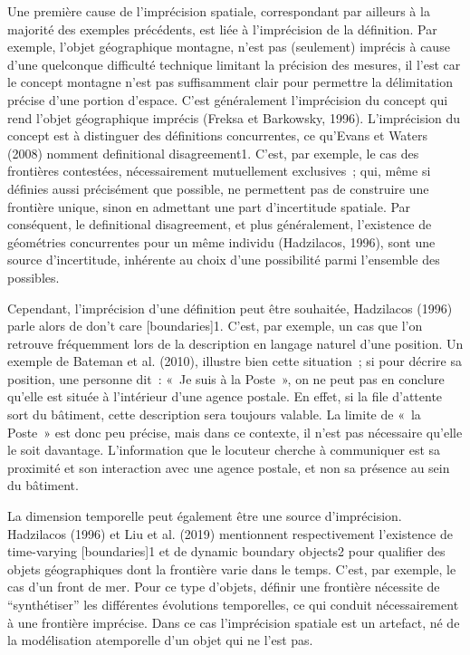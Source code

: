 Une première cause de l’imprécision spatiale, correspondant par
ailleurs à la majorité des exemples précédents, est liée à
l’imprécision de la définition. Par exemple, l’objet géographique
montagne, n’est pas (seulement) imprécis à cause d’une quelconque
difficulté technique limitant la précision des mesures, il l’est car
le concept montagne n’est pas suffisamment clair pour permettre la
délimitation précise d’une portion d’espace. C’est généralement
l’imprécision du concept qui rend l’objet géographique imprécis
(Freksa et Barkowsky, 1996). L’imprécision du concept est à distinguer
des définitions concurrentes, ce qu’Evans et Waters (2008) nomment
definitional disagreement1. C’est, par exemple, le cas des frontières
contestées, nécessairement mutuellement exclusives ; qui, même si
définies aussi précisément que possible, ne permettent pas de
construire une frontière unique, sinon en admettant une part
d’incertitude spatiale. Par conséquent, le definitional disagreement,
et plus généralement, l’existence de géométries concurrentes pour un
même individu (Hadzilacos, 1996), sont une source d’incertitude,
inhérente au choix d’une possibilité parmi l’ensemble des possibles.

Cependant, l’imprécision d’une définition peut être souhaitée,
Hadzilacos (1996) parle alors de don't care [boundaries]1. C’est, par
exemple, un cas que l’on retrouve fréquemment lors de la description
en langage naturel d’une position. Un exemple de Bateman et
al. (2010), illustre bien cette situation ; si pour décrire sa
position, une personne dit : « Je suis à la Poste », on ne peut pas en
conclure qu’elle est située à l’intérieur d’une agence postale. En
effet, si la file d’attente sort du bâtiment, cette description sera
toujours valable. La limite de « la Poste » est donc peu précise, mais
dans ce contexte, il n’est pas nécessaire qu’elle le soit
davantage. L’information que le locuteur cherche à communiquer est sa
proximité et son interaction avec une agence postale, et non sa
présence au sein du bâtiment.

La dimension temporelle peut également être une source
d’imprécision. Hadzilacos (1996) et Liu et al. (2019) mentionnent
respectivement l’existence de time-varying [boundaries]1 et de dynamic
boundary objects2 pour qualifier des objets géographiques dont la
frontière varie dans le temps. C’est, par exemple, le cas d’un front
de mer. Pour ce type d’objets, définir une frontière nécessite de
“synthétiser” les différentes évolutions temporelles, ce qui conduit
nécessairement à une frontière imprécise. Dans ce cas l’imprécision
spatiale est un artefact, né de la modélisation atemporelle d’un objet
qui ne l’est pas.

